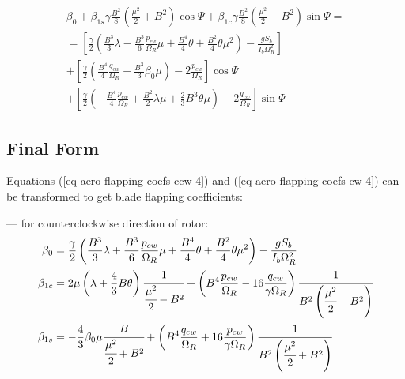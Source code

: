 \begin{multline}
  \label{eq-aero-flapping-coefs-cw-4}
  \beta_0
  +
  \beta_{1s} \gamma \frac{B^2}{8}
  \left( \frac{\mu^2}{2} + B^2 \right) \cos \Psi
  +
  \beta_{1c} \gamma \frac{B^2}{8}
  \left( \frac{\mu^2}{2} - B^2 \right) \sin \Psi
  = \\ =
  \left[
    \frac{\gamma}{2}
    \left(
        \frac{B^3}{3} \lambda
      - \frac{B^3}{6} \frac{p_{cw}}{\Omega_R} \mu
      + \frac{B^4}{4} \theta
      + \frac{B^2}{4} \theta \mu^2
    \right) - \frac{ g S_b }{ I_b \Omega_R^2 }
  \right]
  \\
  + \left[
    \frac{\gamma}{2}
    \left(
      \frac{B^4}{4} \frac{q_{cw}}{\Omega_R}
      - \frac{B^3}{3} \beta_0 \mu
    \right) - 2 \frac{p_{cw}}{\Omega_R}
  \right] \cos \Psi
  \\
  + \left[
    \frac{\gamma}{2}
    \left(
      - \frac{B^4}{4} \frac{p_{cw}}{\Omega_R}
      + \frac{B^2}{2} \lambda \mu
      + \frac{2}{3} B^3 \theta \mu
    \right) - 2 \frac{q_{cw}}{\Omega_R}
  \right] \sin \Psi
\end{multline}

\clearpage

\subsection{Final Form}

Equations (\ref{eq-aero-flapping-coefs-ccw-4}) and (\ref{eq-aero-flapping-coefs-cw-4}) can be transformed to get blade flapping coefficients:

--- for counterclockwise direction of rotor:
\begin{align}
  \beta_0 &=
  \frac{\gamma}{2}
  \left(
      \frac{B^3}{3} \lambda 
    + \frac{B^3}{6} \frac{p_{cw}}{\Omega_R} \mu
    + \frac{B^4}{4} \theta
    + \frac{B^2}{4} \theta \mu^2
  \right) - \frac{ g S_b }{ I_b \Omega_R^2 }
  \\
  \beta_{1c} &=
  2 \mu \left( \lambda + \frac{4}{3} B \theta \right)
  \cfrac{1}{\cfrac{\mu^2}{2} - B^2}
  +
  \left(
      B^4 \frac{p_{cw}}{\Omega_R}
    - 16 \frac{q_{cw}}{\gamma \Omega_R}
  \right)
  \cfrac{1}{B^2\left(\cfrac{\mu^2}{2}-B^2\right)}
  \\
  \beta_{1s} &=
  - \frac{4}{3} \beta_0 \mu
  \cfrac{B}{\cfrac{\mu^2}{2} + B^2}
  +
  \left(
      B^4 \frac{q_{cw}}{\Omega_R} 
    + 16 \frac{p_{cw}}{\gamma \Omega_R}
  \right)
  \cfrac{1}{B^2 \left(\cfrac{\mu^2}{2}+B^2\right)}
\end{align}

